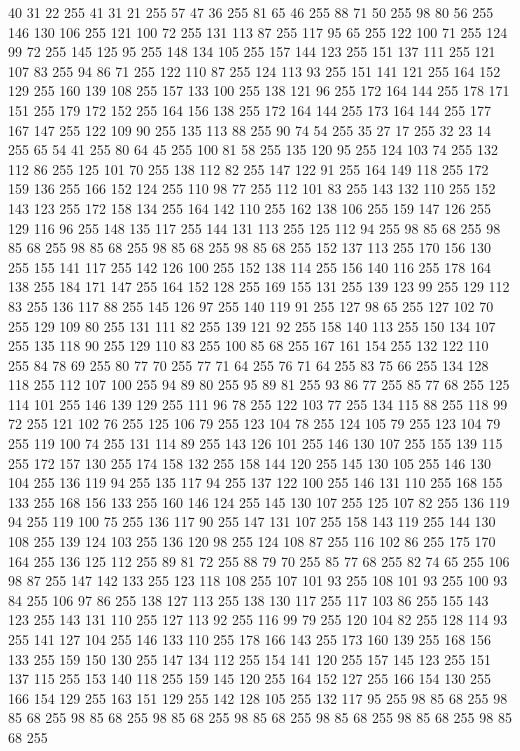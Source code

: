 40 31 22 255 41 31 21 255 57 47 36 255 81 65 46 255 88 71 50 255 98 80 56 255 146 130 106 255 121 100 72 255 131 113 87 255 117 95 65 255 122 100 71 255 124 99 72 255 145 125 95 255 148 134 105 255 157 144 123 255 151 137 111 255 121 107 83 255 94 86 71 255 122 110 87 255 124 113 93 255 151 141 121 255 164 152 129 255 160 139 108 255 157 133 100 255 138 121 96 255 172 164 144 255 178 171 151 255 179 172 152 255 164 156 138 255 172 164 144 255 173 164 144 255 177 167 147 255 122 109 90 255 135 113 88 255 90 74 54 255 35 27 17 255 32 23 14 255 65 54 41 255 80 64 45 255 100 81 58 255 135 120 95 255 124 103 74 255 132 112 86 255 125 101 70 255 138 112 82 255 147 122 91 255 164 149 118 255 172 159 136 255 166 152 124 255 110 98 77 255 112 101 83 255 143 132 110 255 152 143 123 255 172 158 134 255 164 142 110 255 162 138 106 255 159 147 126 255 129 116 96 255 148 135 117 255 144 131 113 255 125 112 94 255 98 85 68 255 98 85 68 255 98 85 68 255
98 85 68 255 98 85 68 255 152 137 113 255 170 156 130 255 155 141 117 255 142 126 100 255 152 138 114 255 156 140 116 255 178 164 138 255 184 171 147 255 164 152 128 255 169 155 131 255 139 123 99 255 129 112 83 255 136 117 88 255 145 126 97 255 140 119 91 255 127 98 65 255 127 102 70 255 129 109 80 255 131 111 82 255 139 121 92 255 158 140 113 255 150 134 107 255 135 118 90 255 129 110 83 255 100 85 68 255 167 161 154 255 132 122 110 255 84 78 69 255 80 77 70 255 77 71 64 255 76 71 64 255 83 75 66 255 134 128 118 255 112 107 100 255 94 89 80 255 95 89 81 255 93 86 77 255 85 77 68 255 125 114 101 255 146 139 129 255 111 96 78 255 122 103 77 255 134 115 88 255 118 99 72 255 121 102 76 255 125 106 79 255 123 104 78 255 124 105 79 255 123 104 79 255 119 100 74 255 131 114 89 255 143 126 101 255 146 130 107 255 155 139 115 255 172 157 130 255 174 158 132 255 158 144 120 255 145 130 105 255 146 130 104 255 136 119 94 255 135 117 94 255 137 122 100 255
146 131 110 255 168 155 133 255 168 156 133 255 160 146 124 255 145 130 107 255 125 107 82 255 136 119 94 255 119 100 75 255 136 117 90 255 147 131 107 255 158 143 119 255 144 130 108 255 139 124 103 255 136 120 98 255 124 108 87 255 116 102 86 255 175 170 164 255 136 125 112 255 89 81 72 255 88 79 70 255 85 77 68 255 82 74 65 255 106 98 87 255 147 142 133 255 123 118 108 255 107 101 93 255 108 101 93 255 100 93 84 255 106 97 86 255 138 127 113 255 138 130 117 255 117 103 86 255 155 143 123 255 143 131 110 255 127 113 92 255 116 99 79 255 120 104 82 255 128 114 93 255 141 127 104 255 146 133 110 255 178 166 143 255 173 160 139 255 168 156 133 255 159 150 130 255 147 134 112 255 154 141 120 255 157 145 123 255 151 137 115 255 153 140 118 255 159 145 120 255 164 152 127 255 166 154 130 255 166 154 129 255 163 151 129 255 142 128 105 255 132 117 95 255 98 85 68 255 98 85 68 255 98 85 68 255 98 85 68 255 98 85 68 255 98 85 68 255 98 85 68 255 98 85 68 255
